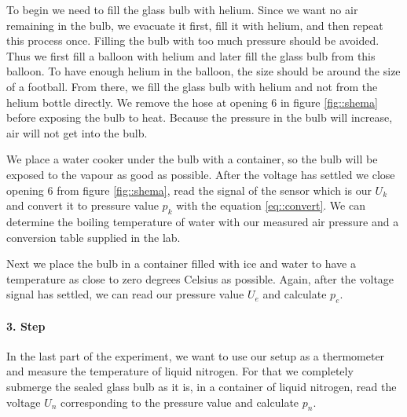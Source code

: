 To begin we need to fill the glass bulb with helium. 
Since we want no air remaining in the bulb, we evacuate it first, fill it with helium, and then repeat this process once. 
Filling the bulb with too much pressure should be avoided.
Thus we first fill a balloon with helium and later fill the glass bulb from this balloon. 
To have enough helium in the balloon, the size should be around the size of a football. 
From there, we fill the glass bulb with helium and not from the helium bottle directly. 
We remove the hose at opening 6 in figure \ref{fig::shema} before exposing the bulb to heat. 
Because the pressure in the bulb will increase, air will not get into the bulb. 


We place a water cooker under the bulb with a container, so the bulb will be exposed to the vapour as good as possible. 
After the voltage has settled we close opening 6 from figure \ref{fig::shema}, read the signal of the sensor which is our $U_k$ and convert it to pressure value $p_k$ with the  equation \ref{eq::convert}. 
We can determine the boiling temperature of water with our measured air pressure and a conversion table supplied in the lab. 


Next we place the bulb in a container filled with ice and water to have a temperature as close to zero degrees Celsius as possible. 
Again, after the voltage signal has settled, we can read our pressure value $U_e$ and calculate $p_e$.

\paragraph{3. Step}
In the last part of the experiment, we want to use our setup as a thermometer and measure the temperature of liquid nitrogen. 
For that we completely submerge the sealed glass bulb as it is, in a container of liquid nitrogen, read the voltage $U_n$ corresponding to the pressure value and calculate $p_n$.


